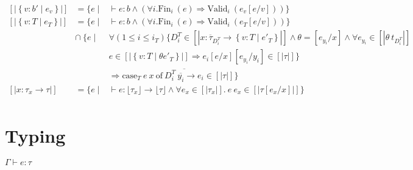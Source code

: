 \documentclass[10pt,a4paper]{article}
\newcommand\dcti{\dct{i}}
\newcommand\dct[1]{\ensuremath{D^T_{#1}}}
\newcommand\eapp[2]{\ensuremath{#1 \ #2}}
\newcommand\edata[2]{\ensuremath{#1 \ #2}}
\newcommand\ecase[5]{\ensuremath{\text{case}_T\ #1\ #2\ \text{of}\ \overline{\edata{#3}{#4} \rightarrow #5}}}
\newcommand\tref[3]{\ensuremath{\left\lbrace {#1} \colon {#2} \mid {#3} \right\rbrace}}
\newcommand\tconref[4]{\tref{#3}{\tcon{#1}{#2}}{#4}}
\newcommand\tcon[2]{\ensuremath{#1\ #2}}
\newcommand\tfun[3]{\ensuremath{#1\colon #2 \rightarrow #3}}
\newcommand\validi[1]{\ensuremath{\text{Valid}_{i}\ (#1)}}
\newcommand\fini[1]{\ensuremath{\text{Fin}_{i}\ (#1)}}
\newcommand\generalconditionInterp[2]
	{\ensuremath{(\forall i. \fini{#1} \Rightarrow \validi{#2})}}
\newcommand\tforalli[1]{\ensuremath{\forall (1\leq i\leq i_{#1})}}
\newcommand\ty[1]{\ensuremath{\text{ty}({#1})}}
\newcommand\sub[2]{\ensuremath{\left[ #2 / #1 \right]}}
\newcommand\erase[1]{\ensuremath{\lfloor #1 \rfloor}}
\newcommand\interp[1]{\ensuremath{[|#1|]}}
\newcommand\evals[2]{\ensuremath{#1 \hookrightarrow^\star #2}}
\newcommand\hastype[3]{\ensuremath{#1 \vdash #2 \colon #3}}
\begin{document}
$$
\begin{array}{lll}
\interp{\tref{v}{b'}{e_v}} &=
	\{e \mid & \hastype{}{e}{b} 
	\land 
	\generalconditionInterp{e}{e_v\sub{v}{e}} 
	\}\\
\interp{\tref{v}{T}{e_T}} &=
	\{e \mid & \hastype{}{e}{b} 
	\land 
	\generalconditionInterp{e}{e_T\sub{v}{e}} 
	\}\\
	&\cap\
	\{ e \mid & \tforalli{T} \{
		\dcti \in \interp{\overline{x\colon\tau_{\dcti}} \rightarrow \tref{v}{T}{e'_T}}
		\land \theta = \sub{x}{e_{y_i}} \land \forall e_{y_i} \in \interp{\theta\ t_{\dcti}} \\
		&& e \in \interp{\tref{v}{T}{\theta e'_T}} 
				\Rightarrow e_i\sub{x}{e}\sub{y_i}{e_{y_i}} \in \interp{\tau}	
	\} \\
	&&\Rightarrow \ecase{e}{x}{\dcti}{\overline{y_i}}{e_i} \in \interp{\tau}
	\}
	\\
\interp{\tfun{x}{\tau_x}{\tau}} &=
	\{e \mid & \hastype{}{e}{\erase{\tau_x} \rightarrow \erase{\tau}} 
	\land 
	\forall e_x \in \interp{\tau_x}. \
	 \eapp{e}{e_x} \in \interp{\tau\sub{x}{e_x}} 
	 \}\\
\end{array}
$$

\section*{Typing}

\hfill\mbox{\hastype{\Gamma}{e}{\tau}}
\end{document}
